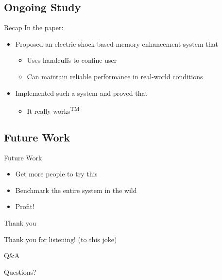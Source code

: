 \documentclass{beamer}
\begin{document}
\subsection{Ongoing Study}
\begin{frame}{Recap}
  In the paper:
  \begin{itemize}
    \item Proposed an electric-shock-based memory enhancement system that
    \begin{itemize}
      \item Uses handcuffs to confine user
      \item Can maintain reliable performance in real-world conditions
    \end{itemize}
    \item Implemented such a system and proved that
    \begin{itemize}
      \item It really works\textsuperscript{TM}
    \end{itemize}
  \end{itemize}
\end{frame}
\subsection{Future Work}
\begin{frame}{Future Work}
  \begin{itemize}
    \item Get more people to try this
    \item Benchmark the entire system in the wild
    \item Profit!
  \end{itemize}
\end{frame}
\begin{frame}{Thank you}
  \begin{center}
    \Huge Thank you for listening! (to this joke)
  \end{center}
\end{frame}
\begin{frame}{Q\&A}
  \begin{center}
    \Huge Questions?
  \end{center}
\end{frame}
\end{document}
